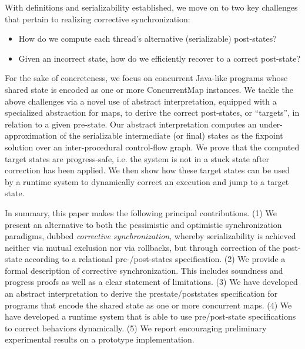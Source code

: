 %
With definitions and serializability established, we move on to two key challenges
that pertain to realizing corrective synchronization:
\begin{itemize}
\item How do we compute each thread's alternative (serializable) post-states?
\item Given an incorrect state, how do we efficiently recover to a correct post-state?
\end{itemize}
%
For the sake of concreteness, we focus on concurrent Java-like
programs whose shared state is encoded as one or more {\sf
  ConcurrentMap} instances.  We tackle the above challenges via a
novel use of abstract interpretation, equipped with a specialized
abstraction for maps, to derive the correct post-states, or ``targets'', in relation to
a given pre-state.
%
Our abstract interpretation computes an
under-approximation of the serializable intermediate (or final) states
as the fixpoint solution over an inter-procedural control-flow graph.
%
We prove that the computed target states are progress-safe, i.e. the system is not in a stuck state after correction has been applied.
%
We then show how these target states can be used by a runtime system to
dynamically correct an execution and jump to a target state. 



In summary, this paper makes the following principal contributions.
  (1) We present an alternative to both the pessimistic and optimistic synchronization paradigms, dubbed \emph{corrective synchronization}, whereby serializability is achieved neither via mutual exclusion nor via rollbacks, but through correction of the post-state according to a relational pre-/post-states specification.
(2) We provide a formal description of corrective synchronization. This includes soundness and progress proofs as well as a clear statement of limitations.
	(3) We have developed an abstract interpretation to derive the prestate/poststates specification for programs that encode the shared state as one or more concurrent maps. 
(4) We have developed a runtime system that is able to use
pre/post-state specifications to correct behaviors dynamically.
%
(5) We report encouraging preliminary experimental results on
a prototype implementation.

